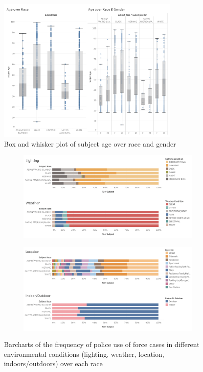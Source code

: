\documentclass[10pt]{article}
\begin{document}
\begin{figure}[H]
\centering
\includegraphics[width=0.8\textwidth]{img2}
\caption{Box and whisker plot of subject age over race and gender}
\label{img2}
\end{figure}


\begin{figure}[H]
\captionsetup{font=small}
    \begin{subfigure}{0.5\textwidth}
        \includegraphics[width=\textwidth]{img4}
        \label{img4}
    \end{subfigure}%
    \begin{subfigure}{0.5\textwidth}
        \includegraphics[width=\textwidth]{img5}
        \label{img5}
    \end{subfigure}
\label{barcharts}
\caption{Barcharts of the frequency of police use of force cases in different environmental conditions (lighting, weather, location, indoors/outdoors) over each race}
\end{figure}
\end{document}
